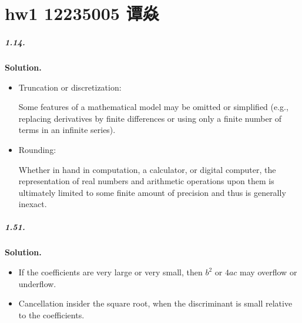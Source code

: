 \documentclass[a4paper]{book}
\newenvironment{solution}%
{\noindent\textbf{Solution.}}%
{\qedhere}
\numberwithin{equation}{chapter}
\theoremstyle{definition}
\begin{document}


\pagestyle{fancy}

\chapter{hw1 12235005 谭焱}

\paragraph*{1.14.}
\begin{solution}
    \begin{itemize}
        \item Truncation or discretization:

              Some features of a mathematical model may be omitted or simplified
              (e.g., replacing  derivatives by finite differences or using only
              a finite number of terms in an infinite series).

        \item Rounding:

              Whether in hand in computation, a calculator, or digital computer,
              the representation of real numbers and arithmetic operations upon
              them is ultimately limited to some finite amount of precision
              and thus is generally inexact.

    \end{itemize}
\end{solution}

\paragraph*{1.51.}
\begin{solution}
    \begin{itemize}
        \item If the coefficients are very large or very small,
              then $b^2$ or $4ac$ may overflow or underflow.

        \item Cancellation insider the square root, when the
              discriminant is small relative to the coefficients.
    \end{itemize}
\end{solution}
\end{document}
